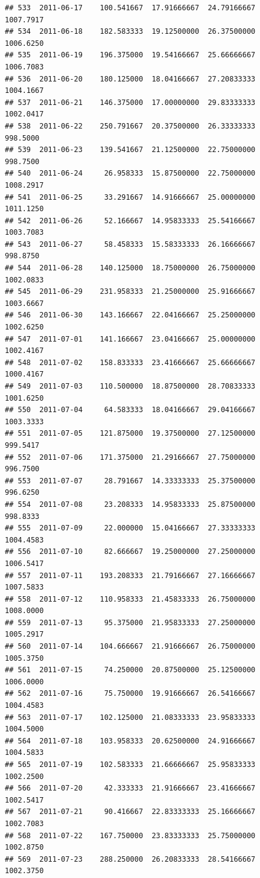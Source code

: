 \documentclass[
]{article}
\begin{document}
\begin{verbatim}
## 533  2011-06-17    100.541667  17.91666667  24.79166667    1007.7917
## 534  2011-06-18    182.583333  19.12500000  26.37500000    1006.6250
## 535  2011-06-19    196.375000  19.54166667  25.66666667    1006.7083
## 536  2011-06-20    180.125000  18.04166667  27.20833333    1004.1667
## 537  2011-06-21    146.375000  17.00000000  29.83333333    1002.0417
## 538  2011-06-22    250.791667  20.37500000  26.33333333     998.5000
## 539  2011-06-23    139.541667  21.12500000  22.75000000     998.7500
## 540  2011-06-24     26.958333  15.87500000  22.75000000    1008.2917
## 541  2011-06-25     33.291667  14.91666667  25.00000000    1011.1250
## 542  2011-06-26     52.166667  14.95833333  25.54166667    1003.7083
## 543  2011-06-27     58.458333  15.58333333  26.16666667     998.8750
## 544  2011-06-28    140.125000  18.75000000  26.75000000    1002.0833
## 545  2011-06-29    231.958333  21.25000000  25.91666667    1003.6667
## 546  2011-06-30    143.166667  22.04166667  25.25000000    1002.6250
## 547  2011-07-01    141.166667  23.04166667  25.00000000    1002.4167
## 548  2011-07-02    158.833333  23.41666667  25.66666667    1000.4167
## 549  2011-07-03    110.500000  18.87500000  28.70833333    1001.6250
## 550  2011-07-04     64.583333  18.04166667  29.04166667    1003.3333
## 551  2011-07-05    121.875000  19.37500000  27.12500000     999.5417
## 552  2011-07-06    171.375000  21.29166667  27.75000000     996.7500
## 553  2011-07-07     28.791667  14.33333333  25.37500000     996.6250
## 554  2011-07-08     23.208333  14.95833333  25.87500000     998.8333
## 555  2011-07-09     22.000000  15.04166667  27.33333333    1004.4583
## 556  2011-07-10     82.666667  19.25000000  27.25000000    1006.5417
## 557  2011-07-11    193.208333  21.79166667  27.16666667    1007.5833
## 558  2011-07-12    110.958333  21.45833333  26.75000000    1008.0000
## 559  2011-07-13     95.375000  21.95833333  27.25000000    1005.2917
## 560  2011-07-14    104.666667  21.91666667  26.75000000    1005.3750
## 561  2011-07-15     74.250000  20.87500000  25.12500000    1006.0000
## 562  2011-07-16     75.750000  19.91666667  26.54166667    1004.4583
## 563  2011-07-17    102.125000  21.08333333  23.95833333    1004.5000
## 564  2011-07-18    103.958333  20.62500000  24.91666667    1004.5833
## 565  2011-07-19    102.583333  21.66666667  25.95833333    1002.2500
## 566  2011-07-20     42.333333  21.91666667  23.41666667    1002.5417
## 567  2011-07-21     90.416667  22.83333333  25.16666667    1002.7083
## 568  2011-07-22    167.750000  23.83333333  25.75000000    1002.8750
## 569  2011-07-23    288.250000  26.20833333  28.54166667    1002.3750

\end{verbatim}
\end{document}
